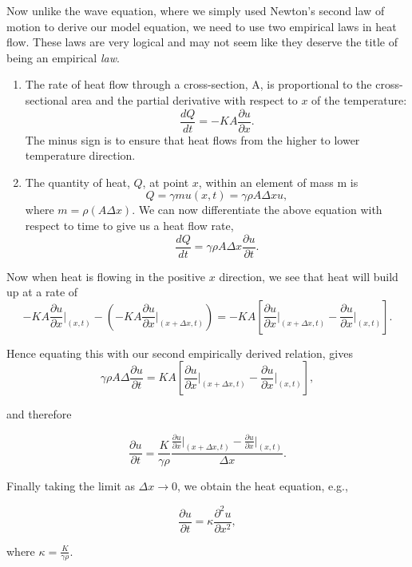 Now unlike the wave equation, where we simply used Newton's second law of motion to derive our model equation, we need to use two empirical laws in heat flow. These laws are very logical and may not seem like they deserve the title of being an empirical \emph{law}. 
\begin{enumerate}
\item The rate of heat flow through a cross-section, A, is proportional to the cross-sectional area and the partial derivative with respect to $x$ of the temperature:$$ \frac{dQ}{dt} = -KA\frac{\partial u}{\partial x}.$$ The minus sign is to ensure that heat flows from the higher to lower temperature direction. 

\item The quantity of heat, $Q$, at point $x$, within an element of mass m is $$Q=\gamma m u(x,t) = \gamma\rho A\Delta x u,$$
where $m = \rho(A\Delta x).$ We can now differentiate the above equation with respect to time to give us a heat flow rate, $$\frac{dQ}{dt} = \gamma\rho A\Delta x\frac{\partial u}{\partial t}.$$
\end{enumerate}

Now when heat is flowing in the positive $x$ direction, we see that heat will build up at a rate of $$-KA \frac{\partial u}{\partial x} \Big|_{(x,t)} - \left( -KA \frac{\partial u}{\partial x} \Big|_{(x+\Delta x,t)}  \right) = -KA\left[  \frac{\partial u}{\partial x} \Big|_{(x+\Delta x,t)}  - \frac{\partial u}{\partial x} \Big|_{(x,t)}  \right].$$

Hence equating this with our second empirically derived relation, gives $$\gamma\rho A \Delta \frac{\partial u}{\partial t} =  KA\left[   \frac{\partial u}{\partial x} \Big|_{(x+\Delta x,t)}  - \frac{\partial u}{\partial x} \Big|_{(x,t)}  \right],$$

and therefore

$$\frac{\partial u}{\partial t} =  \frac{K}{\gamma\rho} \frac{  \frac{\partial u}{\partial x} \Big|_{(x+\Delta x,t)}  - \frac{\partial u}{\partial x} \Big|_{(x,t)} }{\Delta x}.$$

Finally taking the limit as $\Delta x\rightarrow 0$, we obtain the heat equation, e.g., 

$$\frac{\partial u}{\partial t} = \kappa \frac{\partial^2 u}{\partial x^2},$$

where $\kappa = \frac{K}{\gamma\rho}.$


